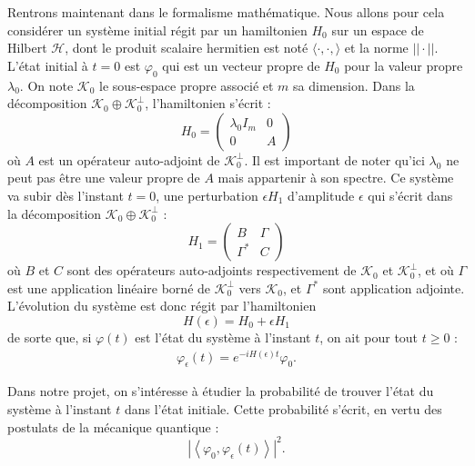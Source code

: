 \documentclass[12pt,openany,a4paper, titlepage]{article}
\newcommand{\la}{\left\langle}
\newcommand{\ra}{\right\rangle}
\newcommand{\vp}{\varphi}
\theoremstyle{definition}
\theoremstyle{definition}
\theoremstyle{definition}
\theoremstyle{definition}
\theoremstyle{definition}
\theoremstyle{definition}
\begin{document}
Rentrons maintenant dans le formalisme mathématique. Nous allons pour cela considérer un système initial régit par un hamiltonien $H_0$ sur un espace de Hilbert $\mathcal{H}$, dont le produit scalaire hermitien est noté $\langle \cdot, \cdot, \rangle$ et la norme $||\cdot ||$. L'état initial à $t=0$ est $\vp_0$ qui est un vecteur propre de $H_0$ pour la valeur propre $\lambda_0$. On note $\mathcal{K}_0$ le sous-espace propre associé et $m$ sa dimension. Dans la décomposition $\mathcal{K}_0 \oplus \mathcal{K}_0^\perp$, l'hamiltonien s'écrit :
\begin{equation}
    H_0 = \begin{pmatrix}
\lambda_0I_m & 0 \\
0    & A 
\end{pmatrix}
\end{equation}
où $A$ est un opérateur auto-adjoint de $\mathcal{K}_0^\perp$. Il est important de noter qu'ici $\lambda_0$ ne peut pas être une valeur propre de $A$ mais appartenir à son spectre. Ce système va subir dès l'instant $t=0$, une perturbation $\epsilon H_1$ d'amplitude $\epsilon$ qui s'écrit dans la décomposition $\mathcal{K}_0 \oplus \mathcal{K}_0^\perp$ :
\begin{equation}
    H_1 = \begin{pmatrix}
B        & \Gamma \\
\Gamma^* &  C
\end{pmatrix}
\end{equation}
où $B$ et $C$ sont des opérateurs auto-adjoints respectivement de $\mathcal{K}_0$ et $\mathcal{K}_0^\perp$, et où $\Gamma$ est une application linéaire borné de $\mathcal{K}_0^\perp$ vers $\mathcal{K}_0$, et $\Gamma^*$ sont application adjointe. L'évolution du système est donc régit par l'hamiltonien
\begin{equation}
    H(\epsilon) = H_0 + \epsilon H_1
\end{equation}
de sorte que, si $\vp(t)$ est l'état du système à l'instant $t$, on ait pour tout $t\geq 0$ :
\begin{eqnarray}
    \vp_\epsilon(t) = e^{-iH(\epsilon)t}\vp_0.
\end{eqnarray}

Dans notre projet, on s'intéresse à étudier la probabilité de trouver l'état du système à l'instant $t$ dans l'état initiale. Cette probabilité s'écrit, en vertu des postulats de la mécanique quantique :
\begin{equation}
    |\la \vp_0, \vp_\epsilon(t) \ra |^2.
\end{equation}
\end{document}
